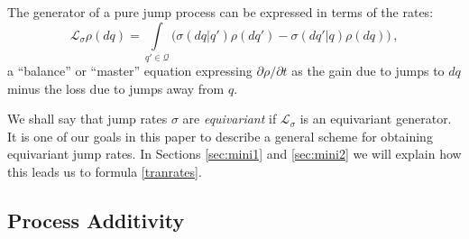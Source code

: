 \documentclass[12pt]{article}
\newcommand{\1}{\mathbf{1}} %
\newcommand{\conf}{\mathcal{Q}} %
\newcommand{\generator}{\mathscr{L}} %
\begin{document}
The generator of a pure jump process can be expressed in terms of the
rates:
\begin{equation}\label{continuity3}
   \generator_\sigma \rho(dq) = \int\limits_{q'\in\conf}  \Big(
   \sigma(dq|q') \rho(dq') - \sigma(dq'|q) \rho(dq) \Big)\,,
\end{equation}
a ``balance'' or ``master'' equation expressing $\partial
\rho/\partial t$ as the gain due to jumps to $dq$ minus the loss due
to jumps away from $q$.

We shall say that jump rates $\sigma$ are \emph{equivariant} if
$\generator_\sigma$ is an equivariant generator.  It is one of our goals
in
this paper to describe  a general scheme for obtaining equivariant jump
rates. In Sections \ref{sec:mini1} and \ref{sec:mini2} we will explain 
how
this leads us to formula \eqref{tranrates}.


\subsection{Process Additivity}\label{sec:introadd}
\end{document}
